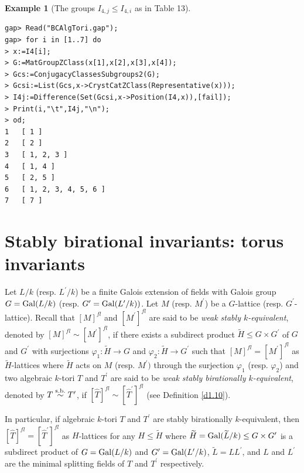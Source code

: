 \documentclass{amsart}
\theoremstyle{plain}
\theoremstyle{definition}
\newtheorem{example}[theorem]{Example}
\theoremstyle{remark}
\newcounter{sub}\def\tr{\mbox{tr }}
\begin{document}
\bigskip
\begin{example}[The groups $I_{4,j}\leq I_{4,i}$ as in Table 13]~\vspace*{-5mm}\\
\begin{verbatim}
gap> Read("BCAlgTori.gap");
gap> for i in [1..7] do
> x:=I4[i];
> G:=MatGroupZClass(x[1],x[2],x[3],x[4]);
> Gcs:=ConjugacyClassesSubgroups2(G);
> Gcsi:=List(Gcs,x->CrystCatZClass(Representative(x)));
> I4j:=Difference(Set(Gcsi,x->Position(I4,x)),[fail]);
> Print(i,"\t",I4j,"\n");
> od;
1	[ 1 ]
2	[ 2 ]
3	[ 1, 2, 3 ]
4	[ 1, 4 ]
5	[ 2, 5 ]
6	[ 1, 2, 3, 4, 5, 6 ]
7	[ 7 ]
\end{verbatim}
\end{example}
%

\section{Stably birational invariants: torus invariants}\label{S4}

Let $L/k$ (resp. $L^\prime/k$) be a finite Galois extension of fields 
with Galois group $G={\rm Gal}(L/k)$ 
(resp. $G^\prime={\rm Gal}(L^\prime/k))$. 
Let $M$ (resp. $M^\prime$) be a $G$-lattice (resp. $G^\prime$-lattice). 
Recall that $[M]^{fl}$ and $[M^\prime]^{fl}$ are 
said to be {\it weak stably $k$-equivalent}, 
denoted by $[M]^{fl}\sim [M^\prime]^{fl}$, if 
there exists a subdirect product $\widetilde{H}\leq G\times G^\prime$ 
of $G$ and $G^\prime$ 
with surjections 
$\varphi_1:\widetilde{H}\rightarrow G$ and 
$\varphi_2:\widetilde{H}\rightarrow G^\prime$ 
such that $[M]^{fl}=[M^\prime]^{fl}$ 
as $\widetilde{H}$-lattices 
where $\widetilde{H}$ acts on $M$ (resp. $M^\prime)$ 
through the surjection $\varphi_1$ (resp. $\varphi_2$) 
and 
two algebraic $k$-tori $T$ and $T^\prime$ are 
said to be {\it weak stably birationally $k$-equivalent}, 
denoted by $T\stackrel{\rm s.b.}{\sim} T^\prime$, 
if $[\widehat{T}]^{fl}\sim [\widehat{T}^\prime]^{fl}$ 
(see Definition \ref{d1.10}). 

In particular, 
if algebraic $k$-tori $T$ and $T^\prime$ are 
stably birationally $k$-equivalent, 
then $[\widehat{T}]^{fl}=[\widehat{T}^\prime]^{fl}$ as 
$H$-lattices for any $H\leq \widetilde{H}$ 
where $\widetilde{H}={\rm Gal}(\widetilde{L}/k)\leq G\times G^\prime$ 
is a subdirect product of 
$G={\rm Gal}(L/k)$ and $G^\prime={\rm Gal}(L^\prime/k)$, 
$\widetilde{L}=LL^\prime$, and $L$ and $L^\prime$ 
are the minimal splitting fields of $T$ and $T^\prime$ respectively.
\end{document}
